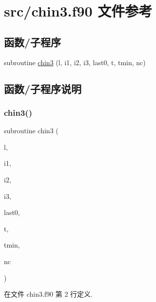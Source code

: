 \hypertarget{chin3_8f90}{}\section{src/chin3.f90 文件参考}
\label{chin3_8f90}
\subsection*{函数/子程序}
\begin{DoxyCompactItemize}
\item 
subroutine \mbox{\hyperlink{chin3_8f90_a8724e2ebbfef99c2f7f07b42f89621b9}{chin3}} (l, i1, i2, i3, last0, t, tmin, nc)
\end{DoxyCompactItemize}


\subsection{函数/子程序说明}
\mbox{\label{chin3_8f90_a8724e2ebbfef99c2f7f07b42f89621b9}} 
\subsubsection{\texorpdfstring{chin3()}{chin3()}}
{\footnotesize\ttfamily subroutine chin3 (\begin{DoxyParamCaption}\item[{}]{l,  }\item[{}]{i1,  }\item[{}]{i2,  }\item[{}]{i3,  }\item[{}]{last0,  }\item[{}]{t,  }\item[{}]{tmin,  }\item[{}]{nc }\end{DoxyParamCaption})}



在文件 chin3.\+f90 第 2 行定义.

